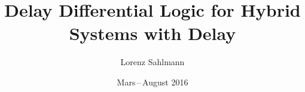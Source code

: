 \documentclass[
    draft,
    fontsize=10pt,
    a4paper,
    oneside,
    abstract=on,
    toc=bibliographynumbered
]{scrreprt}
\newcommand*{\cdepartment}{}%
\newcommand*{\department}[1]{\gdef\cdepartment{#1}}
\newcommand*{\cinstitution}{}%
\newcommand*{\institution}[1]{\gdef\cinstitution{#1}}
\newcommand*{\csupervisor}{}%
\newcommand*{\supervisor}[1]{\gdef\csupervisor{#1}}
\newcommand*{\csupervisorinst}{}%
\newcommand*{\supervisorinst}[1]{\gdef\csupervisorinst{#1}}
\newcommand*{\cscndsupervisor}{}%
\newcommand*{\scndsupervisor}[1]{\gdef\cscndsupervisor{#1}}
\newcommand*{\cscndsupervisorinst}{}%
\newcommand*{\scndsupervisorinst}[1]{\gdef\cscndsupervisorinst{#1}}
\renewcommand{\maketitle}{}
\begin{document}
\department{Master Comasic}
\institution{École Polytechnique}
\subject{Stage de Recherche\\ at\\ Carnegie Mellon University}
\title{Delay Differential Logic for Hybrid Systems with Delay}
\author{Lorenz Sahlmann}
\date{Mars\,--\,August 2016}
\supervisor{Prof.~Dr.~André Platzer}
\supervisorinst{Carnegie Mellon University}
\scndsupervisor{Eric Goubault}
\scndsupervisorinst{École Polytechnique}


% 

% 

% 

% 



% 

% 

% 


\nocite{Fulton16LogicProofs,*}


\end{document}
